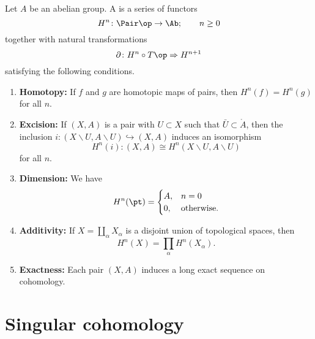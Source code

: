 \documentclass[main.tex]{subfiles}
\begin{document}
\begin{definition}
  \label{def:cohomology_theory}
  Let $A$ be an abelian group. A  is a series of functors
  \begin{equation*}
    H^{n}\colon \Pair\op \to \Ab;\qquad n \geq 0
  \end{equation*}
  together with natural transformations
  \begin{equation*}
    \partial\colon H^{n} \circ T\op \Rightarrow H^{n+1}
  \end{equation*}
  satisfying the following conditions.
  \begin{enumerate}
    \item \textbf{Homotopy:} If $f$ and $g$ are homotopic maps of pairs, then $H^{n}(f) = H^{n}(g)$ for all $n$.

    \item \textbf{Excision:} If $(X, A)$ is a pair with $U \subset X$ such that $\bar{U} \subset \mathring{A}$, then the inclusion $i\colon (X\smallsetminus U, A \smallsetminus U) \hookrightarrow (X, A)$ induces an isomorphism
      \begin{equation*}
        H^{n}(i)\colon (X, A) \cong H^{n}(X \smallsetminus U, A \smallsetminus U)
      \end{equation*}
      for all $n$.

    \item \textbf{Dimension:} We have
      \begin{equation*}
        H^{n}(\pt) =
        \begin{cases}
          A, &n = 0 \\
          0, &\text{otherwise}.
        \end{cases}
      \end{equation*}

    \item \textbf{Additivity:} If $X = \coprod_{\alpha} X_{\alpha}$ is a disjoint union of topological spaces, then
      \begin{equation*}
        H^{n}(X) = \prod_{\alpha} H^{n}(X_{\alpha}).
      \end{equation*}

    \item \textbf{Exactness:} Each pair $(X, A)$ induces a long exact sequence on cohomology.
  \end{enumerate}
\end{definition}

\section{Singular cohomology}
\label{sec:singular_cohomology}
\end{document}
